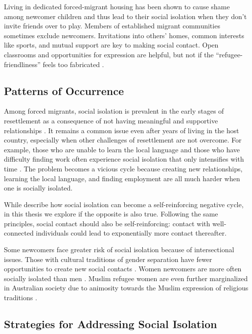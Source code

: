 Living in dedicated forced-migrant housing has been shown to cause shame among newcomer children and thus lead to their social isolation when they don't invite friends over to play. Members of established migrant communities sometimes exclude newcomers. Invitations into others' homes, common interests like sports, and mutual support are key to making social contact. Open classrooms and opportunities for expression are helpful, but not if the ``refugee-friendliness'' feels too fabricated \cite{anderson_you_2001}.


\subsection*{Patterns of Occurrence}

Among forced migrants, social isolation is prevalent in the early stages of resettlement as a consequence of not having meaningful and supportive relationships \cite{simich_social_2003}. It remains a common issue even after years of living in the host country, especially when other challenges of resettlement are not overcome. For example, those who are unable to learn the local language and those who have difficulty finding work often experience social isolation that only intensifies with time \cite[p.~166]{almohamed_designing_2016}. The problem becomes a vicious cycle because creating new relationships, learning the local language, and finding employment are all much harder when one is socially isolated.

While  describe how social isolation can become a self-reinforcing negative cycle, in this thesis we explore if the opposite is also true. Following the same principles, social contact should also be self-reinforcing: contact with well-connected individuals could lead to exponentially more contact thereafter.

Some newcomers face greater risk of social isolation because of intersectional issues. Those with cultural traditions of gender separation have fewer opportunities to create new social contacts \cite{almohamed_designing_2016}. Women newcomers are more often socially isolated than men \cite{hynie_immigrant_2011}. Muslim refugee women are even further marginalized in Australian society due to animosity towards the Muslim expression of religious traditions \cite{casimiro_isolation_2007}.


\subsection*{Strategies for Addressing Social Isolation}

